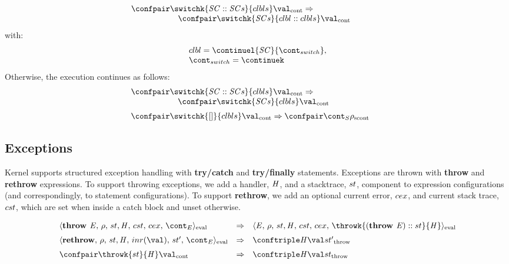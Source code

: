\documentclass{article}
\begin{document}
\[
  \begin{array}{lcl}
	\contconf{\switchk{\scase :: \scases}{\clbls}}{\val}
	\Rightarrow \hspace{30mm}\\
	\hspace{20mm}\contconf{\switchk{\scases}{\clbl :: \clbls}}{\val}
  \end{array}
\]
with:
\[
  \begin{array}{l}
	\clbl = \continuel{\scase}{\switchcont},\\
	\switchcont = \continuek
  \end{array}
\]
\noindent
Otherwise, the execution continues as follows:
\[
  \begin{array}{lcl}
    \contconf{\switchk{\scase :: \scases}{\clbls}}{\val}
	\Rightarrow \hspace{30mm}\\
	\hspace{20mm}\contconf{\switchk{\scases}{\clbls}}{\val}\\[2mm]

	\contconf{\switchk{[]}{\clbls}}{\val}
	\Rightarrow
	\scontconf{\scont}{\env}
  \end{array}
\]

\subsection{Exceptions}

Kernel supports structured exception handling with \textbf{try/catch} and \textbf{try/finally} statements. Exceptions are thrown with \textbf{throw} and \textbf{rethrow} expressions. To support throwing exceptions, we add a handler, $\mathit{H}$, and a stacktrace, $st$, component to expression configurations (and correspondingly, to statement configurations). To support \textbf{rethrow}, we add an optional current error, $cex$, and current stack trace, $cst$, which are set when inside a catch block and unset otherwise.

\[
  \begin{array}{lcl}
	\evalconf{\textbf{throw } \expr}{\env}{\strace}{\cstrace}{\cex}{\econt}
	& \Rightarrow &
	\evalconf{\expr}{\env}{\strace}{\cstrace}{\cex}{\throwk{(\textbf{throw } \expr) :: \strace}{\handler}}\\[2mm]

	\evalconf{\textbf{rethrow}}{\env}{\strace}{inr(\val)}{\strace'}{\econt}
	& \Rightarrow &
	\throwconf{\handler}{\val}{\strace'}\\[2mm]

	\contconf{\throwk{\strace}{\handler}}{\val}
	& \Rightarrow &
	\throwconf{\handler}{\val}{\strace}\\[2mm]

  \end{array}
\]
\end{document}
